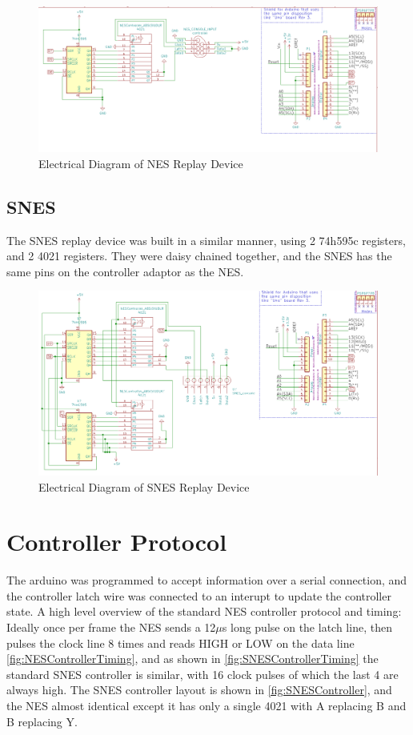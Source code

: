 \documentclass{article}
\begin{document}
\begin{figure}
  \includegraphics[width=\linewidth]{NESTASReplay.png}
  \caption{Electrical Diagram of NES Replay Device}
  \label{fig:NESReplay}
\end{figure}

\subsection{SNES}
The SNES replay device was built in a similar manner, using 2 74h595c registers, and 2 4021 registers.  They were daisy chained together, and the SNES has the same pins on the controller adaptor as the NES.  

\begin{figure}[h]
   \includegraphics[width=\linewidth]{SNESTASReplay.png}
   \caption{Electrical Diagram of SNES Replay Device}
   \label{fig:SNESReplay}
\end{figure}

\section{Controller Protocol}
The arduino was programmed to accept information over a serial connection, and the controller latch wire was connected to an interupt to update the controller state.  A high level overview of the standard NES controller protocol and timing: Ideally once per frame the NES sends a 12$\mu$s long pulse on the latch line, then pulses the clock line 8 times and reads HIGH or LOW on the data line \ref{fig:NESControllerTiming}, and as shown in \ref{fig:SNESControllerTiming} the standard SNES controller is similar, with 16 clock pulses of which the last 4 are always high. The SNES controller layout is shown in \ref{fig:SNESController}, and the NES almost identical except it has only a single 4021 with A replacing B and B replacing Y.
\end{document}
